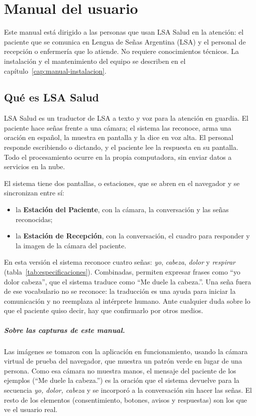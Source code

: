 \chapter{Manual del usuario}\label{cap:manual-usuario}

Este manual está dirigido a las personas que usan LSA Salud en la atención: el paciente que se comunica en Lengua de Señas Argentina (LSA) y el personal de recepción o enfermería que lo atiende. No requiere conocimientos técnicos. La instalación y el mantenimiento del equipo se describen en el capítulo~\ref{cap:manual-instalacion}.

\section{Qué es LSA Salud}

LSA Salud es un traductor de LSA a texto y voz para la atención en guardia. El paciente hace señas frente a una cámara; el sistema las reconoce, arma una oración en español, la muestra en pantalla y la dice en voz alta. El personal responde escribiendo o dictando, y el paciente lee la respuesta en su pantalla. Todo el procesamiento ocurre en la propia computadora, sin enviar datos a servicios en la nube.

El sistema tiene dos pantallas, o estaciones, que se abren en el navegador y se sincronizan entre sí:
\begin{itemize}
  \item la \textbf{Estación del Paciente}, con la cámara, la conversación y las señas reconocidas;
  \item la \textbf{Estación de Recepción}, con la conversación, el cuadro para responder y la imagen de la cámara del paciente.
\end{itemize}

En esta versión el sistema reconoce cuatro señas: \emph{yo}, \emph{cabeza}, \emph{dolor} y \emph{respirar} (tabla~\ref{tab:especificaciones}). Combinadas, permiten expresar frases como ``yo dolor cabeza'', que el sistema traduce como ``Me duele la cabeza.''. Una seña fuera de ese vocabulario no se reconoce: la traducción es una ayuda para iniciar la comunicación y no reemplaza al intérprete humano. Ante cualquier duda sobre lo que el paciente quiso decir, hay que confirmarlo por otros medios.

\paragraph{Sobre las capturas de este manual.} Las imágenes se tomaron con la aplicación en funcionamiento, usando la cámara virtual de prueba del navegador, que muestra un patrón verde en lugar de una persona. Como esa cámara no muestra manos, el mensaje del paciente de los ejemplos (``Me duele la cabeza.'') es la oración que el sistema devuelve para la secuencia \emph{yo, dolor, cabeza} y se incorporó a la conversación sin hacer las señas. El resto de los elementos (consentimiento, botones, avisos y respuestas) son los que ve el usuario real.


